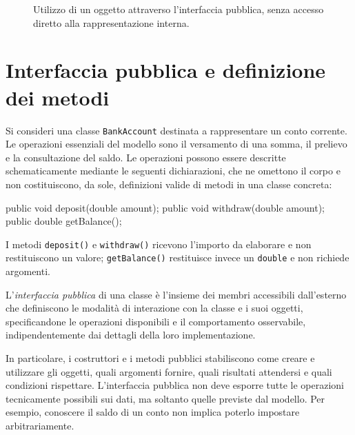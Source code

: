 \begin{figure}[htbp]
  \centering
  
  \caption{Utilizzo di un oggetto attraverso l'interfaccia pubblica,
  senza accesso diretto alla rappresentazione interna.}
  \label{fig:fi-java-classi-black-box}
\end{figure}

\section{Interfaccia pubblica e definizione dei metodi}
\label{sec:fi-java-classi-metodi}

Si consideri una classe \texttt{BankAccount} destinata a
rappresentare un conto corrente. Le operazioni essenziali del modello
sono il versamento di una somma, il prelievo e la consultazione del
saldo. Le operazioni possono essere descritte schematicamente mediante
le seguenti dichiarazioni, che ne omettono il corpo e non
costituiscono, da sole, definizioni valide di metodi in una
classe concreta:

\begin{unipdcode}[language=Java]
public void deposit(double amount);
public void withdraw(double amount);
public double getBalance();
\end{unipdcode}

\clearpage

I metodi
\texttt{deposit()} e \texttt{withdraw()} ricevono l'importo da
elaborare e non restituiscono un valore; \texttt{getBalance()}
restituisce invece un \texttt{double} e non richiede argomenti.

\begin{definition}
\label{def:fi-java-classi-interfaccia}
L'\emph{interfaccia pubblica} di una classe è l'insieme dei
membri accessibili dall'esterno che definiscono le modalità
di interazione con la classe e i suoi oggetti, specificandone
le operazioni disponibili e il comportamento osservabile,
indipendentemente dai dettagli della loro implementazione.
\end{definition}

In particolare, i costruttori e i metodi pubblici stabiliscono
come creare e utilizzare gli oggetti, quali argomenti fornire,
quali risultati attendersi e quali condizioni rispettare.
L'interfaccia pubblica non deve esporre tutte le operazioni
tecnicamente possibili sui dati, ma soltanto quelle previste
dal modello. Per esempio, conoscere il saldo di un conto non
implica poterlo impostare arbitrariamente.

